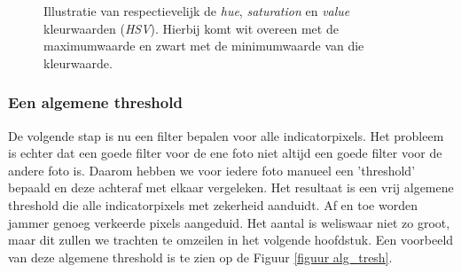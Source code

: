 \documentclass[a4paper,kulak]{kulakarticle}
\begin{document}
	\begin{figure}[h!]
		\centering
		\qquad
		\qquad
		
		\caption{Illustratie van respectievelijk de \textit{hue}, \textit{saturation} en \textit{value} kleurwaarden (\textit{HSV}). Hierbij komt wit overeen met de maximumwaarde en zwart met de minimumwaarde van die kleurwaarde.}
		\label{figuur HSV}
	\end{figure}

	\subsubsection{Een algemene threshold}
		De volgende stap is nu een filter bepalen voor alle indicatorpixels. Het probleem is echter dat een goede filter voor de ene foto niet altijd een goede filter voor de andere foto is. Daarom hebben we voor iedere foto manueel een 'threshold' bepaald en deze achteraf met elkaar vergeleken. Het resultaat is een vrij algemene threshold die alle indicatorpixels met zekerheid aanduidt. Af en toe worden jammer genoeg verkeerde pixels aangeduid. Het aantal is weliswaar niet zo groot, maar dit zullen we trachten te omzeilen in het volgende hoofdstuk. Een voorbeeld van deze algemene threshold is te zien op de Figuur \ref{figuur alg_tresh}.
\end{document}
